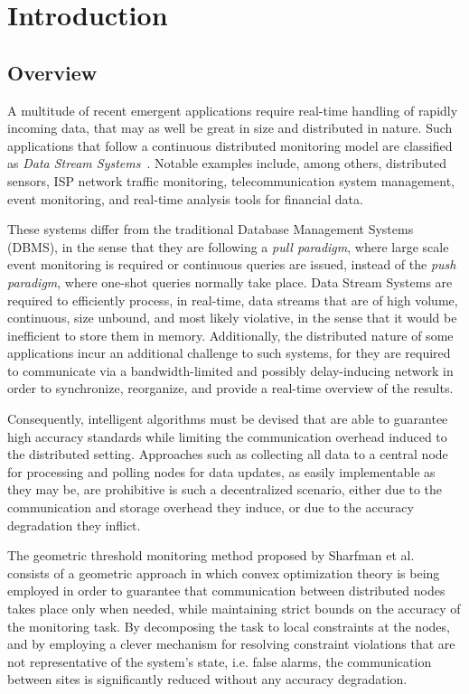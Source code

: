 \chapter{Introduction} \label{chap:intro}
\section{Overview} \label{sec:intro-overview}


A multitude of recent emergent applications require real-time handling of rapidly incoming data, that may as well be great in size and distributed in nature. Such applications that follow a continuous distributed monitoring model are classified as \emph{Data Stream Systems}~\cite{Babcock2002DataStreamSystems}. Notable examples include, among others, distributed sensors, ISP network traffic monitoring, telecommunication system management, event monitoring, and real-time analysis tools for financial data.

These systems differ from the traditional Database Management Systems (DBMS), in the sense that they are following a \emph{pull paradigm}, where large scale event monitoring is required or continuous queries are issued, instead of the \emph{push paradigm}, where one-shot queries normally take place. Data Stream Systems are required to efficiently process, in real-time, data streams that are of high volume, continuous, size unbound, and most likely violative, in the sense that it would be inefficient to store them in memory. Additionally, the distributed nature of some applications incur an additional challenge to such systems, for they are required to communicate via a bandwidth-limited and possibly delay-inducing network in order to synchronize, reorganize, and provide a real-time overview of the results.

Consequently, intelligent algorithms must be devised that are able to guarantee high accuracy standards while limiting the communication overhead induced to the distributed setting. Approaches such as collecting all data to a central node for processing and polling nodes for data updates, as easily implementable as they may be, are prohibitive is such a decentralized scenario, either due to the communication and storage overhead they induce, or due to the accuracy degradation they inflict. 

The geometric threshold monitoring method proposed by Sharfman et al.~\cite{Sharfman2006GM} consists of a geometric approach in which convex optimization theory is being employed in order to guarantee that communication between distributed nodes takes place only when needed, while maintaining strict bounds on the accuracy of the monitoring task. By decomposing the task to local constraints at the  nodes, and by employing a clever mechanism for resolving constraint violations that are not representative of the system's state, i.e. false alarms, the communication between sites is significantly reduced without any accuracy degradation.

